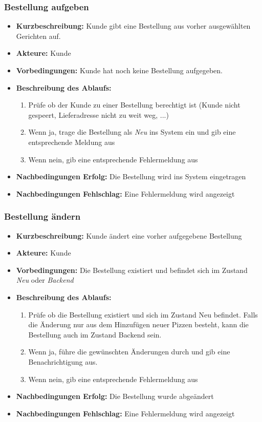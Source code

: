 \documentclass[a4paper]{report}
\begin{document}
\subsubsection*{Bestellung aufgeben}
\begin{itemize}
    \item \textbf{Kurzbeschreibung:} Kunde gibt eine Bestellung aus vorher ausgewählten Gerichten auf.
    \item \textbf{Akteure:} Kunde
    \item \textbf{Vorbedingungen:} Kunde hat noch keine Bestellung aufgegeben.
    \item \textbf{Beschreibung des Ablaufs:}
        \begin{enumerate}
            \item Prüfe ob der Kunde zu einer Bestellung berechtigt ist (Kunde nicht gespeert, Lieferadresse nicht zu weit weg, ...)
            \item Wenn ja, trage die Bestellung als \textit{Neu} ins System ein und gib eine entsprechende Meldung aus
            \item Wenn nein, gib eine entsprechende Fehlermeldung aus
        \end{enumerate}
    \item \textbf{Nachbedingungen Erfolg:} Die Bestellung wird ins System eingetragen
    \item \textbf{Nachbedingungen Fehlschlag:} Eine Fehlermeldung wird angezeigt
\end{itemize}
%
\subsubsection*{Bestellung ändern}
\begin{itemize}
    \item \textbf{Kurzbeschreibung:} Kunde ändert eine vorher aufgegebene Bestellung
    \item \textbf{Akteure:} Kunde
    \item \textbf{Vorbedingungen:} Die Bestellung existiert und befindet sich im Zustand \textit{Neu} oder \textit{Backend}
    \item \textbf{Beschreibung des Ablaufs:}
        \begin{enumerate}
            \item Prüfe ob die Bestellung existiert und sich im Zustand Neu befindet. Falls die Änderung nur aus dem Hinzufügen neuer Pizzen besteht, kann die Bestellung auch im Zustand Backend sein.
            \item Wenn ja, führe die gewünschten Änderungen durch und gib eine Benachrichtigung aus.
            \item Wenn nein, gib eine entsprechende Fehlermeldung aus
        \end{enumerate}
    \item \textbf{Nachbedingungen Erfolg:} Die Bestellung wurde abgeändert
    \item \textbf{Nachbedingungen Fehlschlag:} Eine Fehlermeldung wird angezeigt
\end{itemize}
%
\end{document}

